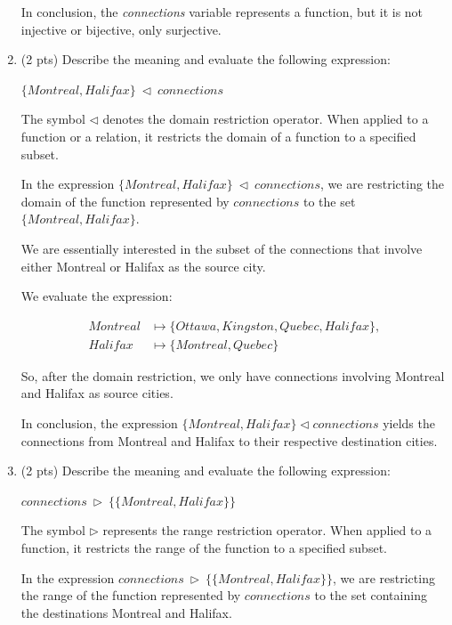 \documentclass[12pt]{article}
\begin{document}
\begin{spacing}{1.5}
\begin{enumerate}
		      In conclusion, the \textit{connections} variable represents a function, but it is not injective or bijective, only surjective.
		      
		\item (2 pts) Describe the meaning and evaluate the following expression:
		      
		      \indent $\{Montreal, Halifax\} \: \triangleleft \: connections$
		      
		      The symbol $\triangleleft$ denotes the domain restriction operator. When applied to a function or a relation, it restricts the domain of a function to a specified subset.
		      
		      In the expression $\{Montreal, Halifax\} \: \triangleleft \: connections$, we are restricting the domain of the function represented by $connections$ to the set $\{Montreal, Halifax\}$.
		      
		      We are essentially interested in the subset of the connections that involve either Montreal or Halifax as the source city.
		      
		      We evaluate the expression:
		          
		      \begin{align*}
		      	Montreal & \mapsto \{Ottawa, Kingston, Quebec, Halifax\}, \\
		      	Halifax  & \mapsto \{Montreal, Quebec\}                   
		      \end{align*}
		      
		      So, after the domain restriction, we only have connections involving Montreal and Halifax as source cities.
		      
		      In conclusion, the expression $\{Montreal, Halifax\} \triangleleft connections$ yields the connections from Montreal and Halifax to their respective destination cities.
		      
		\item (2 pts) Describe the meaning and evaluate the following expression:
		      
		      \indent $connections \: \triangleright \: \{\{Montreal, Halifax\}\}$
		      
		      The symbol $\triangleright$ represents the range restriction operator. When applied to a function, it restricts the range of the function to a specified subset.
		      
		      In the expression $connections \: \triangleright \: \{\{Montreal, Halifax\}\}$, we are restricting the range of the function represented by $connections$ to the set containing the destinations Montreal and Halifax.
		      

\end{enumerate}
\end{spacing}
\end{document}
